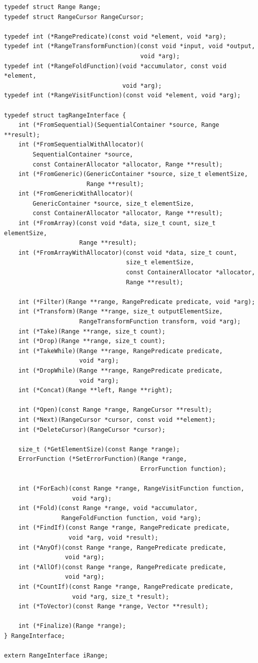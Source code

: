 \begin{verbatim}
typedef struct Range Range;
typedef struct RangeCursor RangeCursor;

typedef int (*RangePredicate)(const void *element, void *arg);
typedef int (*RangeTransformFunction)(const void *input, void *output,
                                      void *arg);
typedef int (*RangeFoldFunction)(void *accumulator, const void *element,
                                 void *arg);
typedef int (*RangeVisitFunction)(const void *element, void *arg);

typedef struct tagRangeInterface {
    int (*FromSequential)(SequentialContainer *source, Range **result);
    int (*FromSequentialWithAllocator)(
        SequentialContainer *source,
        const ContainerAllocator *allocator, Range **result);
    int (*FromGeneric)(GenericContainer *source, size_t elementSize,
                       Range **result);
    int (*FromGenericWithAllocator)(
        GenericContainer *source, size_t elementSize,
        const ContainerAllocator *allocator, Range **result);
    int (*FromArray)(const void *data, size_t count, size_t elementSize,
                     Range **result);
    int (*FromArrayWithAllocator)(const void *data, size_t count,
                                  size_t elementSize,
                                  const ContainerAllocator *allocator,
                                  Range **result);

    int (*Filter)(Range **range, RangePredicate predicate, void *arg);
    int (*Transform)(Range **range, size_t outputElementSize,
                     RangeTransformFunction transform, void *arg);
    int (*Take)(Range **range, size_t count);
    int (*Drop)(Range **range, size_t count);
    int (*TakeWhile)(Range **range, RangePredicate predicate,
                     void *arg);
    int (*DropWhile)(Range **range, RangePredicate predicate,
                     void *arg);
    int (*Concat)(Range **left, Range **right);

    int (*Open)(const Range *range, RangeCursor **result);
    int (*Next)(RangeCursor *cursor, const void **element);
    int (*DeleteCursor)(RangeCursor *cursor);

    size_t (*GetElementSize)(const Range *range);
    ErrorFunction (*SetErrorFunction)(Range *range,
                                      ErrorFunction function);

    int (*ForEach)(const Range *range, RangeVisitFunction function,
                   void *arg);
    int (*Fold)(const Range *range, void *accumulator,
                RangeFoldFunction function, void *arg);
    int (*FindIf)(const Range *range, RangePredicate predicate,
                  void *arg, void *result);
    int (*AnyOf)(const Range *range, RangePredicate predicate,
                 void *arg);
    int (*AllOf)(const Range *range, RangePredicate predicate,
                 void *arg);
    int (*CountIf)(const Range *range, RangePredicate predicate,
                   void *arg, size_t *result);
    int (*ToVector)(const Range *range, Vector **result);

    int (*Finalize)(Range *range);
} RangeInterface;

extern RangeInterface iRange;
\end{verbatim}

